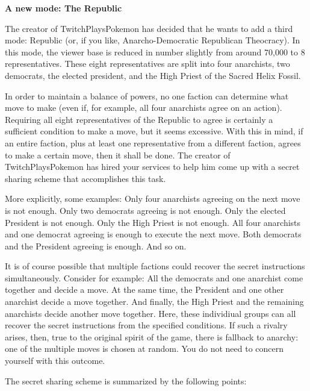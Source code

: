 \documentclass[]{article}
\begin{document}
\begin{qunlist}
\textbf{A new mode: The Republic}

The creator of TwitchPlaysPokemon has decided that he wants to add a third mode: Republic (or, if you like, Anarcho-Democratic Republican Theocracy). 
In this mode, the viewer base is reduced in number slightly from around 70,000 to $8$ representatives. 
These eight representatives are split into four anarchists, two democrats, the elected president, and the High Priest of the Sacred Helix Fossil. 

In order to maintain a balance of powers, no one faction can determine what move to make (even if, for example, all four anarchists agree on an action). Requiring all eight representatives of the Republic to agree is certainly a sufficient condition to make a move, but it seems excessive. With this in mind, if an entire faction, plus at least one representative from a different faction, agrees to make a certain move, then it shall be done.
The creator of TwitchPlaysPokemon has hired your services to help him come up with a secret sharing scheme that accomplishes this task.

More explicitly, some examples: 
Only four anarchists agreeing on the next move is not enough. 
Only two democrats agreeing is not enough. 
Only the elected President is not enough. 
Only the High Priest is not enough. 
All four anarchists and one democrat agreeing is enough to execute the next move.
Both democrats and the President agreeing is enough.
And so on.

It is of course possible that multiple factions could recover the secret instructions simultaneously.
Consider for example: All the democrats and one anarchist come together and decide a move. 
At the same time, the President and one other anarchist decide a move together. 
And finally, the High Priest and the remaining anarchists decide another move together. 
Here, these individiual groups can all recover the secret instructions from the specified conditions.
If such a rivalry arises, then, true to the original spirit of the game, there is fallback to anarchy: one of the multiple moves is chosen at random.
You do not need to concern yourself with this outcome.

The secret sharing scheme is summarized by the following points:


\end{qunlist}
\end{document}

